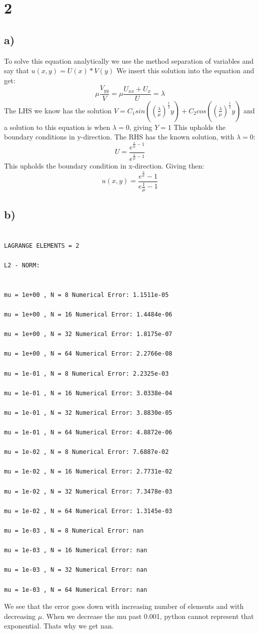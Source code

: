 \documentclass[a4paper,norsk]{article}
\begin{document}
\newpage

\section*{2}
\subsection*{a)}
To solve this equation analytically we use the method separation of variables and say that $u(x,y) = U(x)*V(y)$\newline
We insert this solution into the equation and get:
$$ \mu \frac{V_{yy}}{V} = \mu \frac{U_{xx}+ U_x}{U}  = \lambda$$
The LHS we know has the solution $V = C_1 sin((\frac{\lambda}{\mu})^{\frac{1}{2}}y)+ C_2 cos((\frac{\lambda}{\mu})^{\frac{1}{2}}y)$ and a solution to this equation is when $\lambda = 0$, giving $Y = 1$
This upholds the boundary conditions in y-direction.
\newline
The RHS has the known solution, with $\lambda = 0$:
$$U = \frac{e^{\frac{x}{\mu}-1}}{e^{\frac{1}{\mu}-1}}$$
This upholds the boundary condition in x-direction.
Giving then:
$$u(x,y) = \frac{e^{\frac{x}{\mu}}-1}{e{\frac{1}{\mu}-1}}$$


\subsection*{b)}

\begin{lstlisting}

LAGRANGE ELEMENTS = 2

L2 - NORM:


mu = 1e+00 , N = 8 Numerical Error: 1.1511e-05

mu = 1e+00 , N = 16 Numerical Error: 1.4484e-06

mu = 1e+00 , N = 32 Numerical Error: 1.8175e-07

mu = 1e+00 , N = 64 Numerical Error: 2.2766e-08

mu = 1e-01 , N = 8 Numerical Error: 2.2325e-03

mu = 1e-01 , N = 16 Numerical Error: 3.0338e-04

mu = 1e-01 , N = 32 Numerical Error: 3.8830e-05

mu = 1e-01 , N = 64 Numerical Error: 4.8872e-06

mu = 1e-02 , N = 8 Numerical Error: 7.6887e-02

mu = 1e-02 , N = 16 Numerical Error: 2.7731e-02

mu = 1e-02 , N = 32 Numerical Error: 7.3478e-03

mu = 1e-02 , N = 64 Numerical Error: 1.3145e-03

mu = 1e-03 , N = 8 Numerical Error: nan

mu = 1e-03 , N = 16 Numerical Error: nan

mu = 1e-03 , N = 32 Numerical Error: nan

mu = 1e-03 , N = 64 Numerical Error: nan

\end{lstlisting}
We see that the error goes down with increasing number of elements and with decreasing $\mu$. When we decrease the mu past 0.001, python cannot represent that exponential. Thats why we get nan.
\end{document}
